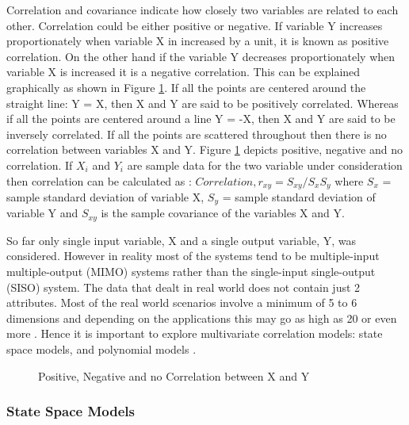\documentclass[article,type=msc,colorback,12pt,accentcolor=tud8b,table]{tudthesis}
\begin{document}
	Correlation and covariance indicate how closely two variables are related to each other. Correlation could be either positive or negative. If variable Y increases proportionately when variable X in increased by a unit, it is known as positive correlation. On the other hand if the variable Y decreases proportionately when variable X is increased it is a negative correlation. This can be explained graphically as shown in Figure \ref{fig:correlation}. If all the points are centered around the straight line: Y = X, then X and Y are said to be positively correlated. Whereas if all the points are centered around a line Y = -X, then X and Y are said to be inversely correlated. If all the points are scattered throughout then there is no correlation between variables X and Y. Figure \ref{fig:correlation} depicts positive, negative and no correlation. If $X_i$ and $Y_i$ are sample data for the two variable under consideration then correlation can be calculated as \cite{freedman2009statistical}: $ Correlation, r_{xy} = S_{xy} / S_x S_y $ where $S_x$ = sample standard deviation of variable X, $S_y$ = sample standard deviation of variable Y and $S_{xy}$ is the sample covariance of the variables X and Y. 
\par
So far only single input variable, X and a single output variable, Y, was considered. However in reality most of the systems tend to be multiple-input multiple-output (MIMO) systems rather than the single-input single-output (SISO) system. The data that dealt in real world does not contain just 2 attributes. Most of the real world scenarios involve a minimum of 5 to 6 dimensions and depending on the applications this may go as high as 20 or even more \cite{friendly2002corrgrams, li2010judging}. Hence it is important to explore multivariate correlation models: state space models, and polynomial models \cite{ljung1987system, ljung1998system, ljung1999system}.

 \begin{figure}
 \begin{center}
  \makebox[\textwidth]{\texttt{[image: B7]}}
\end{center}
\caption{Positive, Negative and no Correlation between X and Y }
\label{fig:correlation}
\end{figure}

\subsubsection{State Space Models}
\end{document}
